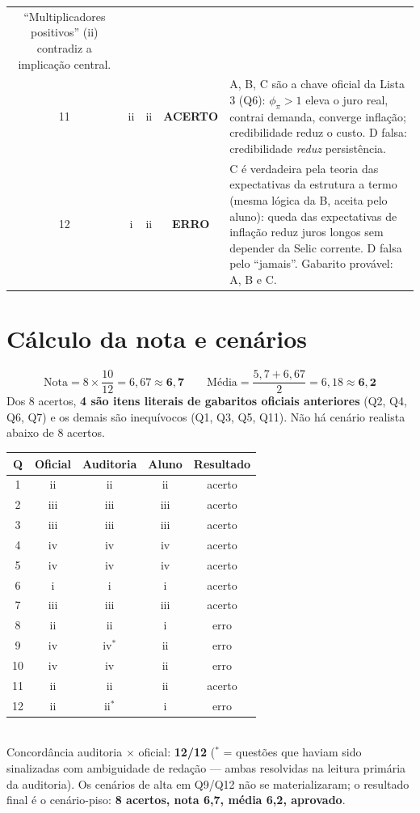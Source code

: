 \documentclass[12pt, a4paper]{article}
\newcommand{\ok}{\textbf{\textcolor{greenbox}{ACERTO}}}
\newcommand{\erro}{\textbf{\textcolor{redf}{ERRO}}}
\begin{document}
{\begin{tabular}{c c c c p{8.6cm}}
``Multiplicadores positivos'' (ii) contradiz a implicação central. \\
11 & ii & ii & \ok & A, B, C são a chave oficial da Lista 3 (Q6): $\phi_\pi>1$
eleva o juro real, contrai demanda, converge inflação; credibilidade reduz o
custo. D falsa: credibilidade \emph{reduz} persistência. \\
12 & i & ii & \erro & C é verdadeira pela teoria das expectativas da
estrutura a termo (mesma lógica da B, aceita pelo aluno): queda das
expectativas de inflação reduz juros longos sem depender da Selic corrente.
D falsa pelo ``jamais''. Gabarito provável: A, B e C. \\
\bottomrule
\end{tabular}
}

\section{Cálculo da nota e cenários}

\begin{notabox}[title={Cenário-piso (gabarito auditado): 8/12}]
\[
\text{Nota} = 8 \times \frac{10}{12} = 6{,}67 \approx \mathbf{6{,}7}
\qquad
\text{Média} = \frac{5{,}7 + 6{,}67}{2} = 6{,}18 \approx \mathbf{6{,}2}
\]
Dos 8 acertos, \textbf{4 são itens literais de gabaritos oficiais anteriores}
(Q2, Q4, Q6, Q7) e os demais são inequívocos (Q1, Q3, Q5, Q11). Não há
cenário realista abaixo de 8 acertos.
\end{notabox}

\begin{notabox}[title={Contraprova com o gabarito oficial (encerrada em 16/07/2026)}]
\renewcommand{\arraystretch}{1.3}
\begin{tabular}{c c c c c}
\toprule
\textbf{Q} & \textbf{Oficial} & \textbf{Auditoria} & \textbf{Aluno} &
\textbf{Resultado} \\
\midrule
1 & ii & ii & ii & acerto \\
2 & iii & iii & iii & acerto \\
3 & iii & iii & iii & acerto \\
4 & iv & iv & iv & acerto \\
5 & iv & iv & iv & acerto \\
6 & i & i & i & acerto \\
7 & iii & iii & iii & acerto \\
8 & ii & ii & i & erro \\
9 & iv & iv$^{*}$ & ii & erro \\
10 & iv & iv & ii & erro \\
11 & ii & ii & ii & acerto \\
12 & ii & ii$^{*}$ & i & erro \\
\bottomrule
\end{tabular}\\[0.4em]
Concordância auditoria $\times$ oficial: \textbf{12/12} ($^{*}$ = questões
que haviam sido sinalizadas com ambiguidade de redação --- ambas resolvidas
na leitura primária da auditoria). Os cenários de alta em Q9/Q12 não se
materializaram; o resultado final é o cenário-piso: \textbf{8 acertos,
nota 6{,}7, média 6{,}2, aprovado}.
\end{notabox}
\end{document}

